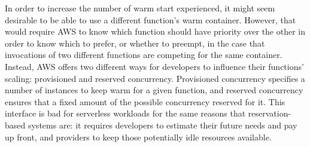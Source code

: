 In order to increase the number of warm start experienced, it might seem
desirable to be able to use a different function's warm container. However, that
would require AWS to know which function should have priority over the other in
order to know which to prefer, or whether to preempt, in the case that
invocations of two different functions are competing for the same container.
Instead, AWS offers two different ways for developers to influence their
functions' scaling: provisioned and reserved concurrency\cite{aws-scaling}.
Provisioned concurrency specifies a number of instances to keep warm for a given
function, and reserved concurrency ensures that a fixed amount of the possible
concurrency reserved for it. This interface is bad for serverless workloads for
the same reasons that reservation-based systems are: it requires developers to
estimate their future needs and pay up front, and providers to keep those
potentially idle resources available.





